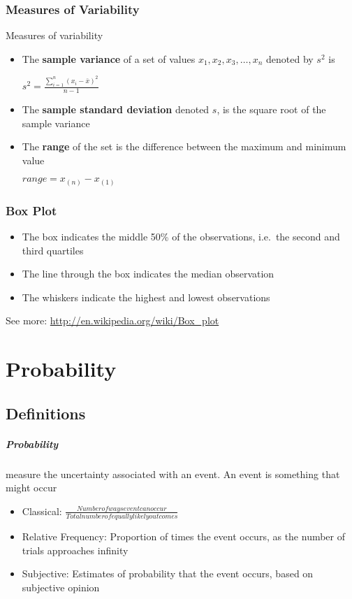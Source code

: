 \documentclass[12pt]{report}
\begin{document}
    \subsection{Measures of Variability}
      Measures of variability
      \begin{itemize}
        \item The \textbf{sample variance} of a set of values $x_1, x_2,
          x_3,\ldots, x_n$ denoted by $s^2$ is
          \begin{center}
            $s^2 = \frac{\sum_{i=1}^{n}{(x_i-\bar{x})}^2}{n-1}$
          \end{center}
        \item The \textbf{sample standard deviation} denoted $s$, is the square
          root of the sample variance
        \item The \textbf{range} of the set is the difference between the
          maximum and minimum value
          \begin{center}
            $range = x_{(n)} - x_{(1)}$
          \end{center}
      \end{itemize}

    \subsection{Box Plot}
      \begin{itemize}
        \item The box indicates the middle 50\% of the observations, i.e.\ the
          second and third quartiles
        \item The line through the box indicates the median observation
        \item The whiskers indicate the highest and lowest observations
      \end{itemize}
      See more: \url{http://en.wikipedia.org/wiki/Box_plot}

\chapter{Probability}
  \section{Definitions}
    \paragraph{Probability} measure the uncertainty associated with an event.
    An event is something that might occur
    \begin{itemize}
      \item Classical: $\frac{Number of ways event can occur}{Total number of
      equally likely outcomes}$
      \item Relative Frequency: Proportion of times the event occurs, as the
      number of trials approaches infinity
      \item Subjective: Estimates of probability that the event occurs, based
      on subjective opinion
    \end{itemize}
\end{document}
